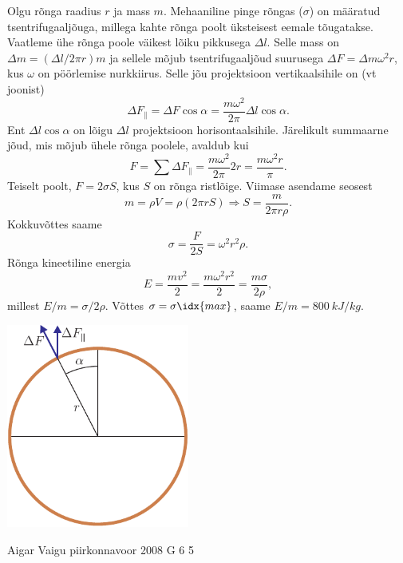 \documentclass[11pt, twoside]{article}
\begin{document}
{{\osa Olgu rõnga raadius $r$ ja mass $m$. Mehaaniline pinge rõngas ($\sigma$) on määratud tsentrifugaaljõuga, millega kahte rõnga poolt üksteisest eemale tõugatakse. Vaatleme ühe rõnga poole väikest lõiku pikkusega $\Delta l$. Selle mass on $\Delta m = (\Delta l/2\pi r)m$ ja sellele mõjub tsentrifugaaljõud suurusega $\Delta F = \Delta m\omega^2 r$, kus $\omega$ on pöörlemise nurkkiirus. Selle jõu projektsioon vertikaalsihile on (vt joonist)
\[
\Delta F_{ \|}=\Delta F \cos \alpha=\frac{m \omega^{2}}{2 \pi} \Delta l \cos \alpha.
\]
Ent $\Delta l \cos \alpha$ on lõigu $\Delta l$ projektsioon horisontaalsihile. Järelikult summaarne jõud, mis mõjub ühele rõnga poolele, avaldub kui
\[
F=\sum \Delta F_{ \|}=\frac{m \omega^{2}}{2 \pi} 2 r=\frac{m \omega^{2} r}{\pi}.
\]
Teiselt poolt, $F = 2\sigma S$, kus $S$ on rõnga ristlõige. Viimase asendame seosest
\[
m=\rho V=\rho(2 \pi r S) \Rightarrow S=\frac{m}{2 \pi r \rho}.
\]
Kokkuvõttes saame
\[
\sigma = \frac{F}{2S} = \omega^2 r^2 \rho.
\]
Rõnga kineetiline energia
\[
E = \frac{mv^2}{2} = \frac{m\omega^2r^2}{2} = \frac{m\sigma}{2\rho},
\]
millest $E/m = \sigma /2\rho$. Võttes $\sigma = \sigma\idx{max}$, saame $E/m = \SI{800}{kJ/kg}$.

\begin{center}
	\includegraphics[width=0.45\textwidth]{2007-v3g-04-yl}
\end{center}
\fi
}

{Aigar Vaigu} %
{piirkonnavoor} %
{2008} %
{G 6} %
{5} %
{

}}
\end{document}

